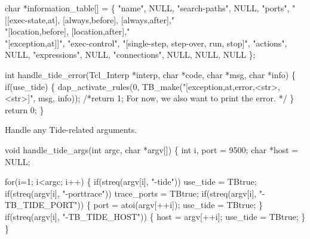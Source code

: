 \nwenddocs{}\endmoddef
char *information_table[] =
\{ "name",               NULL,
  "search-paths",       NULL,
  "ports",              "[[exec-state,at], [always,before], [always,after]," \\
                        "[location,before], [location,after]," \\
                        "[exception,at]]",
  "exec-control",       "[single-step, step-over, run, stop]",
  "actions",            NULL,
  "expressions",        NULL,
  "connections",        NULL,
  NULL,                 NULL
\};
\nwendcode{}\nwdocspar




\nwenddocs{}\endmoddef\let\nwnotused=\nwoutput{}
int handle_tide_error(Tcl_Interp *interp, char *code, char *msg, char *info)
\{
  if(use_tide) \{
    dap_activate_rules(0, TB_make("[exception,at,error,<str>,<str>]", msg, info));
    /*return 1; For now, we also want to print the error. */
  \}
  return 0;
\}
\nwendcode{}\nwdocspar


Handle any Tide-related arguments.

\nwenddocs{}\endmoddef\let\nwnotused=\nwoutput{}
void handle_tide_args(int argc, char *argv[])
\{
  int i, port = 9500;
  char *host = NULL; 

  for(i=1; i<argc; i++) \{
    if(streq(argv[i], "-tide"))
      use_tide = TBtrue;
    if(streq(argv[i], "-porttrace"))
      trace_ports = TBtrue;
    if(streq(argv[i], "-TB_TIDE_PORT")) \{
      port = atoi(argv[++i]);
      use_tide = TBtrue;
    \}
    if(streq(argv[i], "-TB_TIDE_HOST")) \{
      host = argv[++i];
      use_tide = TBtrue;
    \}
  \}

